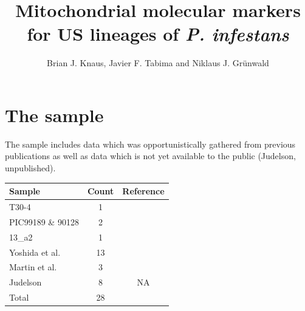 \documentclass{article}\usepackage[]{graphicx}\usepackage[]{color}
\author{Brian J. Knaus, Javier F. Tabima and Niklaus J. Gr\"{u}nwald}
\title{Mitochondrial molecular markers for US lineages of \emph{P. infestans}}
\begin{document}

\maketitle
\newpage


\tableofcontents
\listoffigures
\listoftables

\newpage



\linenumbers

\section{The sample}

The sample includes data which was opportunistically gathered from previous publications as well as data which is not yet available to the public (Judelson, unpublished).

\vspace{12pt}

\begin{center}
\begin{tabular}{ l c c }
  \hline
  Sample & Count & Reference \\
  \hline
  T30-4 & 1 & \cite{haas2009genome} \\
  PIC99189 \& 90128 & 2 & \cite{raffaele2010analyses} \\
  13\_a2 & 1 & \cite{cooke2012genome} \\
  Yoshida et al. & 13 & \cite{yoshida2013correction} \\
  Martin et al. & 3 & \cite{martin2013reconstructing} \\
  Judelson & 8 & NA \\
  \hline
  Total & 28 & \\
  \hline
\end{tabular}
\end{center}

\vspace{12pt}
\end{document}
